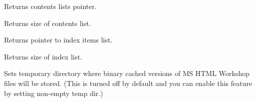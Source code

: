
Returns contents lists pointer.

\label{wxhtmlhelpdatagetcontentscnt}


Returns size of contents list.

\label{wxhtmlhelpdatagetindex}


Returns pointer to index items list.

\label{wxhtmlhelpdatagetindexcnt}


Returns size of index list.

\label{wxhtmlhelpdatasettempdir}


Sets temporary directory where binary cached versions of MS HTML Workshop
files will be stored. (This is turned off by default and you can enable
this feature by setting non-empty temp dir.)

